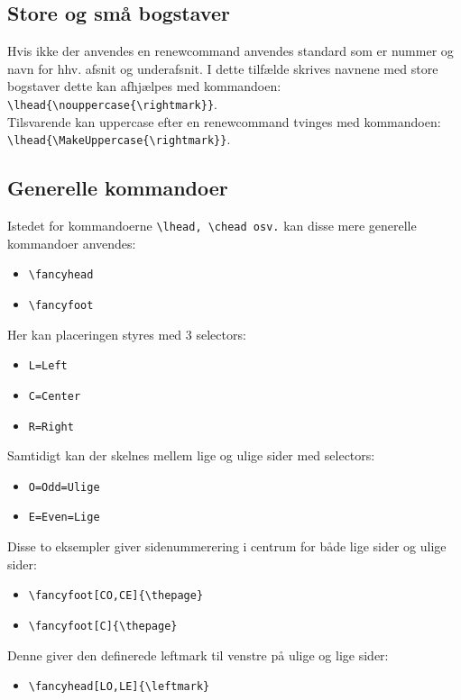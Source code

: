 \documentclass{article}
\begin{document}
\subsection{Store og små bogstaver}
Hvis ikke der anvendes en renewcommand anvendes standard som er nummer og navn for hhv. afsnit og underafsnit. I dette tilfælde skrives navnene med store bogstaver dette kan afhjælpes med kommandoen:\\ \verb"\lhead{\nouppercase{\rightmark}}".\\ Tilsvarende kan uppercase efter en renewcommand tvinges med kommandoen:\\ \verb"\lhead{\MakeUppercase{\rightmark}}".
\subsection{Generelle kommandoer}
Istedet for kommandoerne \verb"\lhead, \chead osv." kan disse mere generelle kommandoer anvendes:
\begin{itemize}
\item \verb"\fancyhead" 
\item \verb"\fancyfoot"
\end{itemize}
Her kan placeringen styres med 3 selectors: 
\begin{itemize}
\item \verb"L=Left" 
\item \verb"C=Center"
\item \verb"R=Right"
\end{itemize}
Samtidigt kan der skelnes mellem lige og ulige sider med selectors:
\begin{itemize}
\item \verb"O=Odd=Ulige" 
\item \verb"E=Even=Lige"
\end{itemize}
Disse to eksempler giver sidenummerering i centrum for både lige sider og ulige sider:
\begin{itemize}
\item \verb"\fancyfoot[CO,CE]{\thepage}"
\item \verb"\fancyfoot[C]{\thepage}"
\end{itemize}
Denne giver den definerede leftmark til venstre på ulige og lige sider:
\begin{itemize}
\item \verb"\fancyhead[LO,LE]{\leftmark}" 
\end{itemize}
\end{document}
